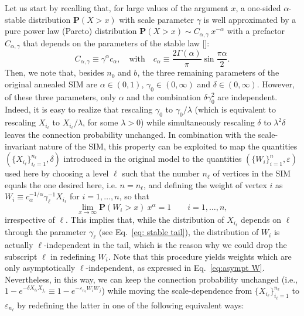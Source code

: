 \documentclass[11pt, reqno]{amsart}
\numberwithin{equation}{section}
\theoremstyle{plain} %
\theoremstyle{definition} %
\newcommand{\eps}{\varepsilon}
\newcommand{\prob}{\mathbf{P}}
\newcommand{\revise}[1]{{\color{black}#1}}
\begin{document}
Let us start by recalling that, for large values of the argument $x$, a one-sided $\alpha$-stable distribution $\prob(X>x)$ with scale parameter $\gamma$ is well approximated by a pure power law (Pareto) distribution $\prob(X>x)\sim C_{\alpha,\gamma}~ x^{-\alpha}$ with a prefactor $C_{\alpha,\gamma}$ that depends on the parameters of the stable law [\cite{samorodnitsky1994m}]:
\begin{equation} \label{eq: stable tail}
 C_{\alpha, \gamma} \equiv    \gamma^{\alpha}c_\alpha,
    \quad\text{with}\quad
c_\alpha\equiv\frac{2\Gamma({\alpha})}{\pi}  \sin{\frac{\pi\alpha}{2}}.  
\end{equation}
Then, we note that, besides $n_0$ and $b$, the three remaining parameters of the original annealed SIM are $\alpha\in(0,1)$, $\gamma_0\in(0,\infty)$ and $\delta\in(0,\infty)$. However, of these three parameters, only $\alpha$ and the combination $\delta \gamma_0^2$ are independent.
Indeed, it is easy to realize that rescaling $\gamma_0$ to $\gamma_0/\lambda$ (which is equivalent to rescaling $X_{i_\ell}$ to $X_{i_\ell}/\lambda$, for some $\lambda>0$) while simultaneously  rescaling $\delta$ to $\lambda^{2}\delta$ leaves the connection probability unchanged.
In combination with the scale-invariant nature of the SIM, this property can be exploited to 
map the quantities $(\{X_{i_\ell}\}_{i_\ell=1}^{n_\ell},\delta)$ introduced in the original model to the quantities $(\{W_{i}\}_{i=1}^{n}, \eps)$ used here by choosing a level $\ell$ such that the number $n_\ell$ of vertices in the SIM equals the one desired here, i.e. $n=n_\ell$, and defining the weight of vertex $i$ as $W_{i} \equiv c_{\alpha}^{-1/\alpha}\gamma_\ell^{-1} X_{i_\ell} $ for $i=1,\dots,n$, so that
\begin{equation} \label{eq:asympt W}
    \lim_{x \to \infty}  \prob(W_{i} > x)~ x^{\alpha} = 1 \qquad i=1,\dots,n,
\end{equation} 
irrespective of $\ell$. 
This implies that, while the distribution of $X_{i_\ell}$ depends on $\ell$ through the parameter $\gamma_\ell$ \revise{(see Eq.~\eqref{eq: stable tail})}, the distribution of $W_{i}$ is actually $\ell$-independent in the tail, which is the reason why we could drop the subscript $\ell$ in redefining $W_{i}$. \revise{Note that this procedure yields weights which are only asymptotically  $\ell$-independent, as expressed in Eq.~\eqref{eq:asympt W}.}
Nevertheless, in this way, we can keep the connection probability unchanged (i.e., $1-e^{-\delta X_{i_\ell} X_{j_\ell}} \equiv 1-e^{-\eps_{n_\ell} W_{i} W_{j}}$) while moving the scale-dependence from $\{X_{i_\ell}\}_{i_\ell=1}^{n_\ell}$ to $\eps_{n_\ell}$ by redefining the latter in one of the following equivalent ways:
\end{document}
